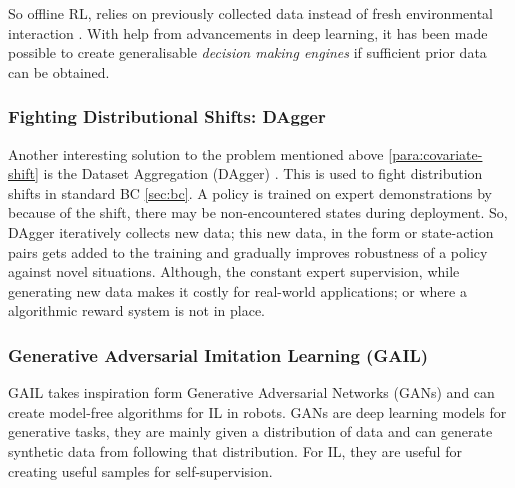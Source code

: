 So offline RL, relies on previously collected data instead of fresh environmental interaction \cite{levine2020offlinereinforcementlearningtutorial}. With help from advancements in deep learning, it has been made possible to create generalisable \emph{decision making engines} \cite{levine2020offlinereinforcementlearningtutorial} if sufficient prior data can be obtained.

\subsubsection{Fighting Distributional Shifts: DAgger}
Another interesting solution to the problem mentioned above \ref{para:covariate-shift} is the Dataset Aggregation (DAgger) \cite{ross2011reductionimitationlearningstructured}. This is used to fight distribution shifts in standard BC \ref{sec:bc}. A policy is trained on expert demonstrations by because of the shift, there may be non-encountered states during deployment. So, DAgger iteratively collects new data; this new data, in the form or state-action pairs gets added to the training and gradually improves robustness of a policy against novel situations. Although, the constant expert supervision, while generating new data makes it costly for real-world applications; or where a algorithmic reward system is not in place.

\subsubsection{Generative Adversarial Imitation Learning (GAIL)}\label{sec:gail}

GAIL \cite{ho2016generativeadversarialimitationlearning}  takes inspiration form Generative Adversarial Networks (GANs) \cite{goodfellow2014generativeadversarialnetworks} and can create model-free algorithms for IL in robots. GANs are deep learning models for generative tasks, they are mainly given a distribution of data and can generate synthetic data from following that distribution. For IL, they are useful for creating useful samples for self-supervision.

